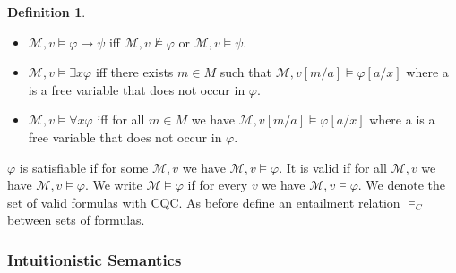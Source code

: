 \documentclass[a4paper,11pt]{report}
\theoremstyle{definition}
\theoremstyle{definition}
\theoremstyle{definition}
\theoremstyle{definition}
\theoremstyle{definition}
\newtheorem{definition}[theorem]{Definition}
\theoremstyle{definition}
\theoremstyle{definition}
\begin{document}
\begin{definition}
\begin{itemize}
			\item $\mathcal M, v\models \varphi\to\psi$ iff $\mathcal M, v\not\models\varphi$ or $\mathcal M, v\models\psi$.
			\item $\mathcal M, v\models\exists x\varphi$ iff there exists $m\in M$ such that $\mathcal M, v[m/a]\models\varphi[a/x]$ where a is a free variable that does not occur in $\varphi$.
			\item $\mathcal M, v\models\forall x\varphi$ iff for all $m\in M$ we have $\mathcal M, v[m/a]\models\varphi[a/x]$ where a is a free variable that does not occur in $\varphi$.
		\end{itemize}
		$\varphi$ is satisfiable if for some $\mathcal{M}, v$ we have  $\mathcal M, v\models\varphi$. It is valid if for all  $\mathcal M, v$ we have  $\mathcal M, v\models\varphi$. We write $\mathcal{M}\models\varphi$ if for every $v$ we have  $\mathcal M, v\models\varphi$. We denote the set of valid formulas with CQC. As before define an entailment relation $\models_C$ between sets of formulas.
	\end{definition}

	\subsubsection{Intuitionistic Semantics}
	
\end{document}
